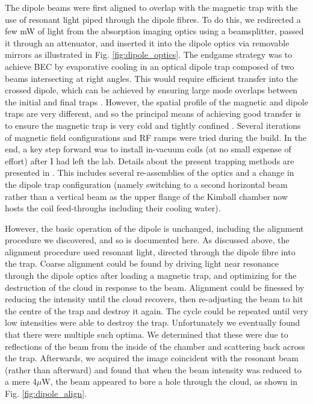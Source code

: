 	The dipole beams were first aligned to overlap with the magnetic trap with the use of resonant light piped through the dipole fibres.
	To do this, we redirected a few mW of light from the absorption imaging optics using a beamsplitter, passed it through an attenuator, and inserted it into the dipole optics via removable mirrors as illustrated in Fig.	\ref{fig:dipole_optics}.
	The endgame strategy was to achieve BEC by evaporative cooling in an optical dipole trap composed of two beams intersecting at right angles.
	This would require efficient transfer into the crossed dipole, which can be achieved by ensuring large mode overlaps between the initial and final traps \cite{MakingProbingUnderstanding}.	
	However, the spatial profile of the magnetic and dipole traps are very different, and so the principal means of achieving good transfer is to ensure the magnetic trap is very cold and tightly confined .
	Several iterations of magnetic field configurations and RF ramps were tried during the build.
	In the end, a key step forward was to install in-vacuum coils (at no small expense of effort) after I had left the lab.
	Details about the present trapping methods are presented in \cite{Abbas21}.
	This includes several re-assemblies of the optics and a change in the dipole trap configuration (namely switching to a second horizontal beam rather than a vertical beam as the upper flange of the Kimball chamber now hosts the coil feed-throughs including their cooling water).
	
	However, the basic operation of the dipole is unchanged, including the alignment procedure we discovered, and so is documented here.
	As discussed above, the alignment procedure used resonant light, directed through the dipole fibre into the trap.
	Coarse alignment could be found by driving light near resonance through the dipole optics after loading a magnetic trap, and optimizing for the destruction of the cloud in response to the beam.
	Alignment could be finessed by reducing the intensity until the cloud recovers, then re-adjusting the beam to hit the centre of the trap and destroy it again.
	The cycle could be repeated until very low intensities were able to destroy the trap.
	Unfortunately we eventually found that there were multiple such optima.
	We determined that these were due to reflections of the beam from the inside of the chamber and scattering back across the trap.
	Afterwards, we acquired the image coincident with the resonant beam (rather than afterward) and found that when the beam intensity was reduced to a mere 4$\mu$W, the beam appeared to bore a hole through the cloud, as shown in Fig.	\ref{fig:dipole_align}.
	
